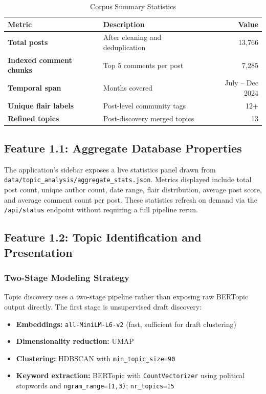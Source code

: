 \documentclass[11pt,a4paper]{article}
\begin{document}
\begin{table}[H]
\centering
\caption{Corpus Summary Statistics}
\renewcommand{\arraystretch}{1.3}
\begin{tabularx}{0.88\textwidth}{>{\bfseries}l X r}
\toprule
\rowcolor{navyblue!10}
Metric & Description & Value \\
\midrule
Total posts & After cleaning and deduplication & 13{,}766 \\
Indexed comment chunks & Top 5 comments per post & 7{,}285 \\
Temporal span & Months covered & July -- Dec 2024 \\
Unique flair labels & Post-level community tags & 12+ \\
Refined topics & Post-discovery merged topics & 13 \\
\bottomrule
\end{tabularx}
\end{table}

\subsection{Feature 1.1: Aggregate Database Properties}

The application's sidebar exposes a live statistics panel drawn from \texttt{data/topic\_analysis/aggregate\_stats.json}. Metrics displayed include total post count, unique author count, date range, flair distribution, average post score, and average comment count per post. These statistics refresh on demand via the \texttt{/api/status} endpoint without requiring a full pipeline rerun.

\subsection{Feature 1.2: Topic Identification and Presentation}

\subsubsection{Two-Stage Modeling Strategy}

Topic discovery uses a two-stage pipeline rather than exposing raw BERTopic output directly. The first stage is unsupervised draft discovery:

\begin{itemize}
  \item \textbf{Embeddings:} \texttt{all-MiniLM-L6-v2} (fast, sufficient for draft clustering)
  \item \textbf{Dimensionality reduction:} UMAP
  \item \textbf{Clustering:} HDBSCAN with \texttt{min\_topic\_size=90}
  \item \textbf{Keyword extraction:} BERTopic with \texttt{CountVectorizer} using political stopwords and \texttt{ngram\_range=(1,3)}; \texttt{nr\_topics=15}
\end{itemize}
\end{document}
